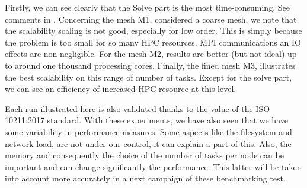 Firstly, we can see clearly that the Solve part is the most time-consuming. See
comments in .
Concerning the mesh M1, considered a coarse mesh, we note that the
scalability scaling is not good, especially for low order. This is simply because the problem is too small for so many HPC resources. MPI
communications an IO effects are non-negligible.
For the mesh M2, results are better (but not ideal) up to around one thousand processing cores.
Finally, the fined mesh M3, illustrates the best scalability on this range of
number of tasks. Except for the solve part, we can see an efficiency of increased
HPC resource at this level.

Each run illustrated here is also validated thanks to the value of the ISO 10211:2017 standard.
With these experiments, we have also seen that we have some variability in
performance measures. Some aspects like the filesystem and network load, are not
under our control, it can explain a part of this. Also, the memory and
consequently the choice of the number of tasks per node can be important and
can change significantly the performance. This latter will be taken into account
more accurately in a next campaign of these benchmarking test.
\newcommand{\barChart}[2][ybar]{
  \begin{tikzpicture}
    \begin{axis}[
      width=\textwidth, height=0.6172\textwidth,
      xlabel={Number of CPU core}, ylabel={Execution time [s]},
      xtick=data,
      xtick align=outside,
      ymin=0,
      ymajorgrids=true, yminorgrids=true,
      bar width=7pt,
      #1
    ]
    \foreach [expand list=true] \thetuple in {#2} {
      \pgfkeys{/mysettings/.cd,
        table/.store in=\mytable,
        column/.store in=\mycolumn,
        shift/.store in=\myshift, shift/.default=0, shift,
        legend/.store in=\mylegend,
        color/.store in=\mycolor
      }
      \edef\temp{
        \noexpand\pgfkeys{/mysettings/.cd, \expandafter\@firstofone\thetuple}
      } \temp
      \edef\temp{
        \noexpand\addplot[ybar, bar width=0.2, fill=\mycolor, draw=black, point meta=y]
        table [x expr=\noexpand\coordindex+\myshift, y=\mycolumn ] {\expandafter\noexpand\csname \mytable\endcsname};
      } \temp
      \edef\temp{
        \noexpand\addlegendentry{\mylegend}
      } \temp
    }
    \end{axis}
\end{tikzpicture}
}


